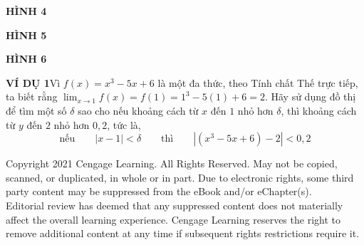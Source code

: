 \vspace{3pt}
\noindent
\begin{minipage}[t]{0.31\textwidth}
  \centering
  \textbf{\textsf{HÌNH 4}}
\end{minipage}\hfill
\begin{minipage}[t]{0.34\textwidth}
  \centering
  \textbf{\textsf{HÌNH 5}}
\end{minipage}\hfill
\begin{minipage}[t]{0.31\textwidth}
  \centering
  \textbf{\textsf{HÌNH 6}}
\end{minipage}
\vspace{12pt}

\noindent
\begin{minipage}[t]{\margincolwidth}
  \vspace{0pt}
\end{minipage}%
\hspace{\colgutter}%
\begin{minipage}[t]{\maincolwidth}
  \vspace{0pt}\noindent
  {\bfseries\color{stewartblue}\textsf{VÍ DỤ 1}}\quad Vì $f(x) = x^3 - 5x + 6$ là một đa thức, theo Tính chất Thế trực tiếp, ta biết rằng $\lim_{x \to 1} f(x) = f(1) = 1^3 - 5(1) + 6 = 2$. Hãy sử dụng đồ thị để tìm một số $\delta$ sao cho nếu khoảng cách từ $x$ đến $1$ nhỏ hơn $\delta$, thì khoảng cách từ $y$ đến $2$ nhỏ hơn $0{,}2$, tức là,
  \[
  \text{nếu}\qquad |x - 1| < \delta \qquad\text{thì}\qquad |(x^3 - 5x + 6) - 2| < 0{,}2
  \]
\end{minipage}

\vfill
{\centering\tiny\color{footercolor}
Copyright 2021 Cengage Learning. All Rights Reserved. May not be copied, scanned, or duplicated, in whole or in part. Due to electronic rights, some third party content may be suppressed from the eBook and/or eChapter(s).\\
Editorial review has deemed that any suppressed content does not materially affect the overall learning experience. Cengage Learning reserves the right to remove additional content at any time if subsequent rights restrictions require it.\par}
